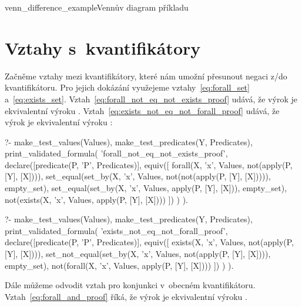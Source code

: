 \begin{fig}{venn_difference_example}{Vennův diagram příkladu}
\end{fig}

\section{Vztahy s~kvantifikátory}

Začněme vztahy mezi kvantifikátory, které nám umožní přesunout negaci z/do kvantifikátoru. Pro jejich dokázání využejeme
vztahy~\eqref{eq:forall_set} a~\eqref{eq:exists_set}. Vztah~\eqref{eq:forall_not_eq_not_exists_proof} udává, že výrok  je ekvivalentní výroku . Vztah~\eqref{eq:exists_not_eq_not_forall_proof} udává, že výrok  je ekvivalentní výroku :

\begin{prolog}
?- 	make_test_values(Values),
	make_test_predicates(Y, Predicates),
	print_validated_formula(
		'forall_not_eq_not_exists_proof',
		declare([predicate(P, 'P', Predicates)],
			equiv([
				forall(X, 'x', Values, not(apply(P, [Y], [X]))),
				set_equal(set_by(X, 'x', Values, not(not(apply(P, [Y], [X])))), empty_set),
				set_equal(set_by(X, 'x', Values, apply(P, [Y], [X])), empty_set),
				not(exists(X, 'x', Values, apply(P, [Y], [X])))
			])
		)
	).
\end{prolog}

\begin{prolog}
?- 	make_test_values(Values),
	make_test_predicates(Y, Predicates),
	print_validated_formula(
		'exists_not_eq_not_forall_proof',
		declare([predicate(P, 'P', Predicates)],
			equiv([
				exists(X, 'x', Values, not(apply(P, [Y], [X]))),
				set_not_equal(set_by(X, 'x', Values, not(apply(P, [Y], [X]))), empty_set),
				not(forall(X, 'x', Values, apply(P, [Y], [X])))
			])
		)
	).
\end{prolog}

Dále můžeme odvodit vztah pro konjunkci v~obecném kvantifikátoru. Vztah~\eqref{eq:forall_and_proof} říká, že výrok  je ekvivalentní výroku .

